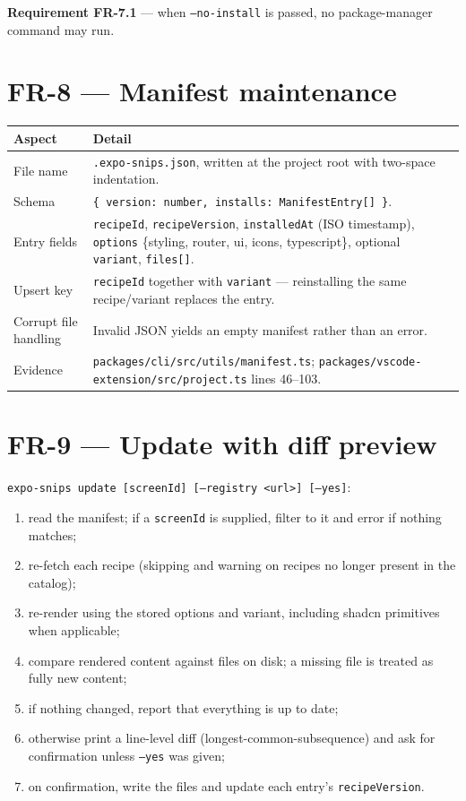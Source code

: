 \textbf{Requirement FR-7.1} --- when \texttt{--no-install} is passed, no
package-manager command may run.

\section{FR-8 --- Manifest maintenance}

\begin{longtable}{p{3.4cm}p{10.6cm}}
\toprule
\textbf{Aspect} & \textbf{Detail} \\
\midrule
\endhead
File name & \texttt{.expo-snips.json}, written at the project root with two-space indentation. \\
Schema & \texttt{\{ version: number, installs: ManifestEntry[] \}}. \\
Entry fields & \texttt{recipeId}, \texttt{recipeVersion}, \texttt{installedAt}
(ISO timestamp), \texttt{options} \{styling, router, ui, icons, typescript\},
optional \texttt{variant}, \texttt{files[]}. \\
Upsert key & \texttt{recipeId} together with \texttt{variant} --- reinstalling the
same recipe/variant replaces the entry. \\
Corrupt file handling & Invalid JSON yields an empty manifest rather than an error. \\
Evidence & \texttt{packages/cli/src/utils/manifest.ts};
\texttt{packages/vscode-extension/src/project.ts} lines 46--103. \\
\bottomrule
\end{longtable}

\section{FR-9 --- Update with diff preview}

\texttt{expo-snips update [screenId] [--registry <url>] [--yes]}:

\begin{enumerate}
  \item read the manifest; if a \texttt{screenId} is supplied, filter to it and
        error if nothing matches;
  \item re-fetch each recipe (skipping and warning on recipes no longer present in
        the catalog);
  \item re-render using the stored options and variant, including shadcn primitives
        when applicable;
  \item compare rendered content against files on disk; a missing file is treated
        as fully new content;
  \item if nothing changed, report that everything is up to date;
  \item otherwise print a line-level diff (longest-common-subsequence) and ask for
        confirmation unless \texttt{--yes} was given;
  \item on confirmation, write the files and update each entry's
        \texttt{recipeVersion}.
\end{enumerate}

